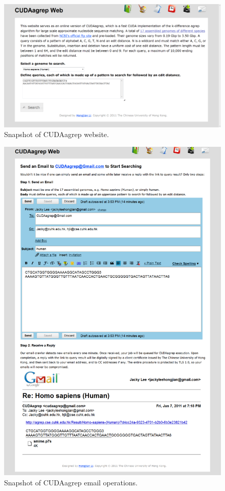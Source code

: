 \begin{figure}
\centering
\includegraphics[width=\textwidth]{SequenceMatching/Figures/CUDAagrepWeb.png}
\caption{Snapshot of CUDAagrep website.}
\label{fig:CUDAagrepWeb}
\end{figure}

\begin{figure}
\centering
\includegraphics[width=\textwidth]{SequenceMatching/Figures/CUDAagrepEmail.png}
\caption{Snapshot of CUDAagrep email operations.}
\label{fig:CUDAagrepEmail}
\end{figure}

